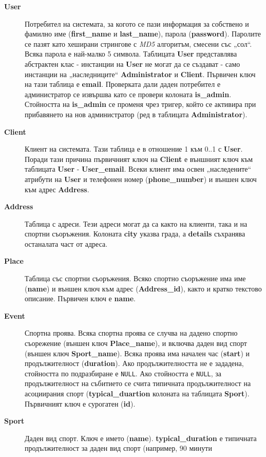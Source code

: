 \documentclass[a4paper,10pt, leqno]{article}
\newcommand{\term}[1] {\textsl{#1}}
\newcommand{\tab}[1] {\textbf{#1}}
\newcommand{\col}[1] {\textbf{#1}}
\begin{document}
	\begin{description}
	    \item[\tab{User}]
	      Потребител на системата, за когото се пази информация за собствено и фамилно име (\col{first\_name} и \col{last\_name}),
	      парола (\col{password}). Паролите се пазят като хеширани стрингове с \term{MD5} алгоритъм, смесени със „сол“. Всяка парола
	      е най-малко 5 символа. Таблицата \tab{User} представлява абстрактен клас - инстанции на \tab{User} не могат да се създават -
	      само инстанции на „наследниците“ \tab{Administrator} и \tab{Client}.
	      Първичен ключ на тази таблица е \tab{email}.
	      Проверката дали даден потребител е администратор се извършва като се провери колоната \col{is\_admin}. Стойността на \col{is\_admin}
	      се променя чрез тригер, който се активира при прибавянето на нов администратор (ред в таблицата \tab{Administrator}).
	    \item[\tab{Client}]
	      Клиент на системата. Тази таблица е в отношение 1 към 0..1 с \tab{User}. Поради тази причина първичният ключ на \tab{Client} е
	      външният ключ към таблицата \tab{User} - \tab{User\_email}. Всеки клиент има освен „наследените“ атрибути на \tab{User} и
	      телефонен номер (\col{phone\_number}) и външен ключ към адрес \tab{Address}.
	    \item[\tab{Address}]
	      Таблица с адреси. Тези адреси могат да са както на клиенти, така и на спортни съоръжения. Колоната \col{city} указва града,
	      а \col{details} съхранява останалата част от адреса.
	    \item[\tab{Place}]
	      Таблица със спортни съоръжения. Всяко спортно съоръжение има име (\col{name}) и външен ключ към адрес (\col{Address\_id}), както и
	      кратко текстово описание. Първичен ключ е \col{name}.
	    \item[\tab{Event}]
	      Спортна проява. Всяка спортна проява се случва на дадено спортно съорежение (външен ключ \col{Place\_name}), и включва даден
	      вид спорт (външен ключ \col{Sport\_name}). Всяка проява има начален час (\col{start}) и продължителност (\col{duration}). Ако 
	      продължителността не е зададена, стойността по подразбиране е \texttt{NULL}. Ако стойността е \texttt{NULL}, за продължителност
	      на събитието се счита типичната продължителност на асоциирания спорт (\col{typical\_duartion} колоната на таблицата \col{Sport}).
	      Първичният ключ е сурогатен (\col{id}).
	    \item[\tab{Sport}]
	      Даден вид спорт. Ключ е името (\col{name}). \col{typical\_duration} е типичната продължителност за даден вид спорт (например, $90$ минути

\end{description}
\end{document}
